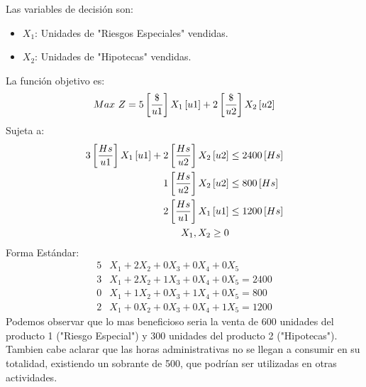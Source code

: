 \documentclass{tarea}
\begin{document}
\begin{homeworkProblem}
Las variables de decisión son:
\begin{itemize}
	\item $X_1$: Unidades de "Riesgos Especiales" vendidas.
	\item $X_2$: Unidades de "Hipotecas" vendidas.
\end{itemize}
La función objetivo es: 
\begin{equation}
	Max\ Z = 5\left[ \frac{\$}{u1} \right]X_1\left[ u1 \right] + 2\left[ \frac{\$}{u2} \right]X_2\left[ u2 \right]
\end{equation}
Sujeta a:
\begin{align*}
	3\left[ \frac{Hs}{u1} \right]X_1\left[ u1 \right] + 2\left[ \frac{Hs}{u2} \right]X_2\left[ u2 \right] &\le 2400\left[ Hs \right] \\
	1\left[ \frac{Hs}{u2} \right]X_2\left[ u2 \right] &\le 800\left[ Hs \right]\\
	2\left[ \frac{Hs}{u1} \right]X_1\left[ u1 \right] &\le 1200\left[ Hs \right]\\
	X_1,X_2 \ge 0	
\end{align*}
Forma Estándar:
\begin{align*}
5&X_1 + 2X_2 + 0X_3 +0X_4 + 0X_5 \\
3&X_1 + 2X_2 + 1X_3 + 0X_4 + 0X_5 = 2400 \\
0&X_1 + 1X_2 + 0X_3 + 1X_4 + 0X_5 = 800 \\
2&X_1 + 0X_2 + 0X_3 + 0X_4 + 1X_5 = 1200
\end{align*}
Podemos observar que lo mas beneficioso seria la venta de 600 unidades del producto 1 ("Riesgo Especial") y 300 unidades del producto 2 ("Hipotecas").
Tambien cabe aclarar que las horas administrativas no se llegan a consumir en su totalidad, existiendo un sobrante de 500, que podrían ser utilizadas en otras actividades.
\end{homeworkProblem}
\end{document}
